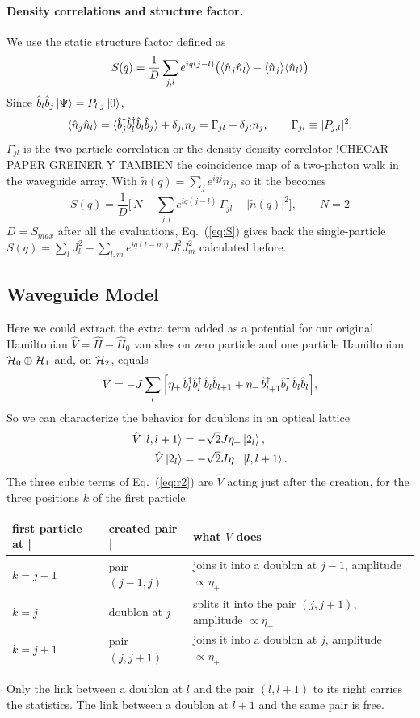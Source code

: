 \documentclass[a4paper, amsfonts, amssymb, amsmath, reprint, showkeys, nofootinbib ,twoside]{revtex4-2}
\begin{document}
\paragraph{Density correlations and structure factor.} We use the static structure factor defined \cite{Caballero0} as
\begin{equation} 
S(q)=\frac1D\sum_{j,l}e^{iq(j-l)}\big(\langle\hat n_{j}\hat n_{l}\rangle-\langle\hat n_{j}\rangle\langle\hat n_{l}\rangle\big)
\end{equation}
Since $\hat b_{l}\hat b_{j}\ket\Psi=P_{l,j}\ket0$,
\begin{equation}\label{eq:nn}
\langle\hat n_{j}\hat n_{l}\rangle=\langle\hat b^\dagger_{j}\hat b^\dagger_{l}\hat b_{l}\hat b_{j}\rangle+\delta_{jl}n_j=\Gamma_{jl}+\delta_{jl}n_j,\qquad \Gamma_{jl}\equiv|P_{j,l}|^2 .
\end{equation}
$\Gamma_{jl}$ is the two-particle correlation or the density-density correlator !CHECAR PAPER GREINER Y TAMBIEN the coincidence map of a two-photon walk in the waveguide array. With $\tilde n(q)=\sum_je^{iqj}n_j$, so it the becomes
\begin{equation}\label{eq:S}
S(q)=\frac1D\Big[\,N+\sum_{j,l}e^{iq(j-l)}\,\Gamma_{jl}-\big|\tilde n(q)\big|^2\Big],\qquad N=2
\end{equation}
$D=S_{max}$ after all the evaluations, Eq.~(\ref{eq:S}) gives back the single-particle $S(q)=\sum_lJ_l^2-\sum_{l,m}e^{iq(l-m)}J_l^2J_m^2$ calculated before.
\subsection{Waveguide Model}
Here we could extract the extra term added as a potential for our original Hamiltonian $\hat V=\hat H-\hat H_0$ vanishes on zero particle and one particle Hamiltonian $\mathcal H_{0}\oplus\mathcal H_{1}$ and, on $\mathcal H_{2}$, equals
\begin{equation}\label{Eq:Vpot}
\hat V=-J\sum_l\Big[\eta_+\,\hat b^\dagger_{l}\hat b^\dagger_{l}\,\hat b_{l}\hat b_{l+1}+\eta_-\,\hat b^\dagger_{l+1}\hat b^\dagger_{l}\,\hat b_{l}\hat b_{l}\Big],
\end{equation}
So we can characterize the behavior for doublons in an optical lattice 
\begin{align}
\hat V\ket{l,l+1}&=-\sqrt2J\eta_+\ket{2_l},\\ \hat V\ket{2_l}&=-\sqrt2J\eta_-\ket{l,l+1}.
\end{align}
The three cubic terms of Eq.~(\ref{eq:r2}) are $\hat V$ acting just after the creation, for the three positions $k$ of the first particle:
\begin{center}
\begin{tabular}{@{}lll@{}}
\toprule
first particle at | & created pair | & what $\hat V$ does\\
\midrule
$k=j-1$ & pair $(j-1,j)$ & joins it into a doublon at $j-1$, amplitude $\propto\eta_+$\\
$k=j$ & doublon at $j$ & splits it into the pair $(j,j+1)$, amplitude $\propto\eta_-$\\
$k=j+1$ & pair $(j,j+1)$ & joins it into a doublon at $j$, amplitude $\propto\eta_+$\\
\bottomrule
\end{tabular}
\end{center}
Only the link between a doublon at $l$ and the pair $(l,l+1)$ to its right carries the statistics. The link between a doublon at $l+1$ and the same pair is free.
\end{document}
